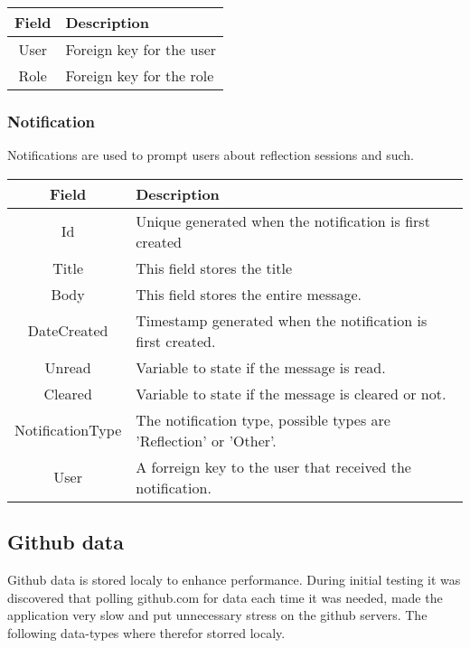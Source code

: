 \vspace{0.5cm}
\begin{tabularx}{\linewidth}{| c | X |}
    \hline
    \rowcolor[gray]{0.8}
    \textbf{Field} & \textbf{Description} \\
    \hline
    User & Foreign key for the user\\ \hline
    Role & Foreign key for the role \\
    \hline
\end{tabularx}
\vspace{0.5cm}

\subsubsection*{Notification}
Notifications are used to prompt users about reflection sessions and such. \\

\vspace{0.5cm}
\begin{tabularx}{\linewidth}{| c | X |}
    \hline
    \rowcolor[gray]{0.8}
    \textbf{Field} & \textbf{Description} \\
    \hline
    Id & Unique generated when the notification is first created\\ \hline
    Title & This field stores the title\\ \hline
   	Body & This field stores the entire message.\\ \hline
    DateCreated & Timestamp generated when the notification is first created.\\ \hline
    Unread & Variable to state if the message is read.\\ \hline
    Cleared & Variable to state if the message is cleared or not.\\ \hline
    NotificationType & The notification type, possible types are 'Reflection' or 'Other'.\\ \hline
    User & A forreign key to the user that received the notification.\\ 
    \hline
\end{tabularx}
\vspace{0.5cm}

\subsection{Github data}
Github data is stored localy to enhance performance. During initial testing it was discovered that polling github.com for data each time it was needed, made the application very slow and put unnecessary stress on the github servers. The following data-types where therefor storred localy.

